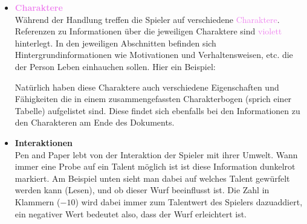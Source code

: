 \begin{itemize}
  \begin{place-box}{Dokument}

  Das Dokument, dass du/ihr gerade liest hat einen weißen Hintergrund auf dem in schwarzer Schrift Text steht. Es sieht sehr schön aus.

  \end{place-box}


  \item \textcolor{violet}{\textbf{Charaktere}} \\
  Während der Handlung treffen die Spieler auf verschiedene \textcolor{violet}{Charaktere}. Referenzen zu Informationen über
  die jeweiligen Charaktere sind \textcolor{violet}{violett} hinterlegt. In den jeweiligen Abschnitten befinden sich
  Hintergrundinformationen wie Motivationen und Verhaltensweisen, etc. die der Person Leben einhauchen sollen. Hier ein
  Beispiel:

  \vspace{16pt}
  \hspace{-0.7cm}
  \begin{centering}
    \noindent{}
  \end{centering}

  Natürlich haben diese Charaktere auch verschiedene Eigenschaften und Fähigkeiten die in einem zusammengefassten Charakterbogen (sprich einer Tabelle)
  aufgelistet sind. Diese findet sich ebenfalls bei den Informationen zu den Charakteren am Ende des Dokuments.

  

  \item \textcolor{RedBoxFrame}{\textbf{Interaktionen}} \\
  Pen and Paper lebt von der \textcolor{RedBoxFrame}{Interaktion} der Spieler mit ihrer Umwelt. Wann immer eine Probe auf ein Talent
  möglich ist ist diese Information \textcolor{RedBoxFrame}{dunkelrot} markiert. Am Beispiel unten sieht man dabei auf welches Talent
  gewürfelt werden kann (Lesen), und ob dieser Wurf beeinflusst ist. Die Zahl in Klammern ($-10$) wird dabei immer zum Talentwert
  des Spielers dazuaddiert, ein negativer Wert bedeutet also, dass der Wurf erleichtert ist.


\end{itemize}
